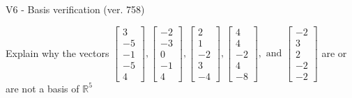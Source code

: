 \begin{exercise}
  \begin{exerciseTitle}V6 - Basis verification (ver. 758)\end{exerciseTitle}
  \begin{exerciseStatement}
    Explain why the vectors \(\left[\begin{array}{r}
3 \\
-5 \\
-1 \\
-5 \\
4
\end{array}\right] , \left[\begin{array}{r}
-2 \\
-3 \\
0 \\
-1 \\
4
\end{array}\right] , \left[\begin{array}{r}
2 \\
1 \\
-2 \\
3 \\
-4
\end{array}\right] , \left[\begin{array}{r}
4 \\
4 \\
-2 \\
4 \\
-8
\end{array}\right] , \text{ and } \left[\begin{array}{r}
-2 \\
3 \\
2 \\
-2 \\
-2
\end{array}\right]\) are or are not a basis of \(\mathbb{R}^5\)	



\end{exerciseStatement}
\end{exercise}
